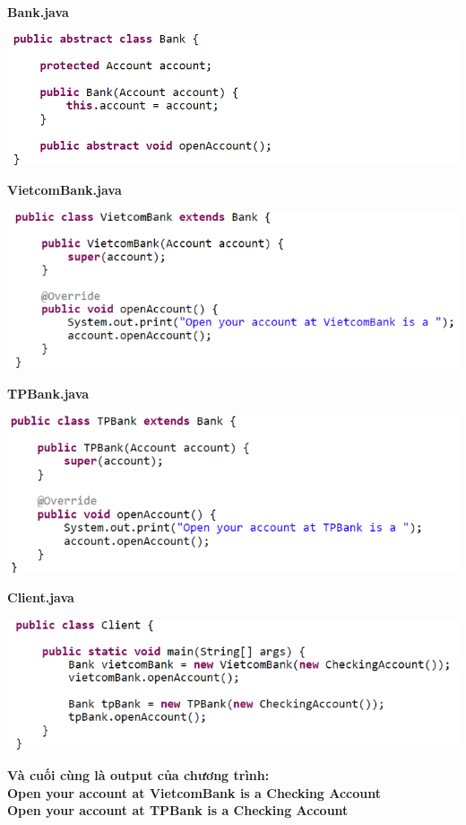 \newpage
\textbf{Bank.java}
\begin{center}
\includegraphics{GALLEYS/images/chapter8/code4}
\end{center}
\textbf{VietcomBank.java}
\begin{center}
\includegraphics{GALLEYS/images/chapter8/code5}
\end{center}
\newpage
\textbf{TPBank.java}
\begin{center}
\includegraphics{GALLEYS/images/chapter8/code6}
\end{center}
\textbf{Client.java}
\begin{center}
\includegraphics{GALLEYS/images/chapter8/code7}
\end{center}
\textbf{Và cuối cùng là output của chương trình:}\\
\textbf{Open your account at VietcomBank is a Checking Account}\\
\textbf{Open your account at TPBank is a Checking Account}

